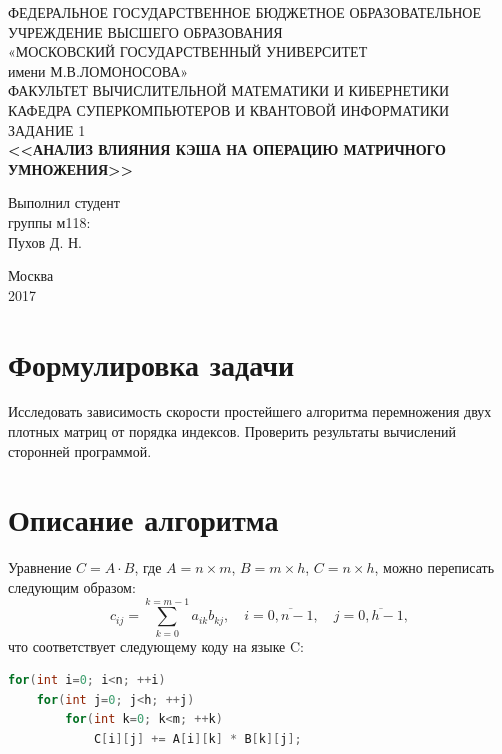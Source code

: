\documentclass[14pt]{extarticle}
\begin{document}
\begin{titlepage}
	\begin{center}
		\small{ФЕДЕРАЛЬНОЕ ГОСУДАРСТВЕННОЕ БЮДЖЕТНОЕ ОБРАЗОВАТЕЛЬНОЕ}\\ 
			УЧРЕЖДЕНИЕ ВЫСШЕГО ОБРАЗОВАНИЯ\\
			«МОСКОВСКИЙ ГОСУДАРСТВЕННЫЙ УНИВЕРСИТЕТ\\
			имени М.В.ЛОМОНОСОВА»\\
		\hfill \break
		ФАКУЛЬТЕТ ВЫЧИСЛИТЕЛЬНОЙ МАТЕМАТИКИ И КИБЕРНЕТИКИ\\
		КАФЕДРА СУПЕРКОМПЬЮТЕРОВ И КВАНТОВОЙ ИНФОРМАТИКИ\\
		\vfill
		ЗАДАНИЕ 1 \\
		\textbf{<<АНАЛИЗ ВЛИЯНИЯ КЭША НА ОПЕРАЦИЮ МАТРИЧНОГО УМНОЖЕНИЯ>>}\\
	\end{center}	
	\vfill
	\begin{flushright}
		Выполнил студент \\
		группы м118:\\
		Пухов Д. Н.\\
		{\hspace{3cm}}
	\end{flushright}
	
	
	\begin{center}
		Москва \\
		2017 
	\end{center}
	
	\thispagestyle{empty}

\end{titlepage}





\section*{Формулировка задачи} 
Исследовать зависимость скорости простейшего алгоритма перемножения двух
плотных матриц от порядка индексов. Проверить результаты вычислений сторонней программой.

\section*{Описание алгоритма}
Уравнение $ C = A \cdot B $, где $ A = n \times m $, $ B = m \times h $, $ C = n \times h $, можно переписать следующим образом:
\begin{equation*}
c_{ij} = \sum \limits_{k=0}^{k=m-1} a_{ik} b_{kj}, \quad i = \overline{0,n-1}, \quad j = \overline{0,h-1},
\end{equation*}
что соответствует следующему коду на языке C:
\begin{lstlisting}[language=C]
for(int i=0; i<n; ++i)
	for(int j=0; j<h; ++j)
		for(int k=0; k<m; ++k)
			C[i][j] += A[i][k] * B[k][j];
\end{lstlisting}
\end{document}
